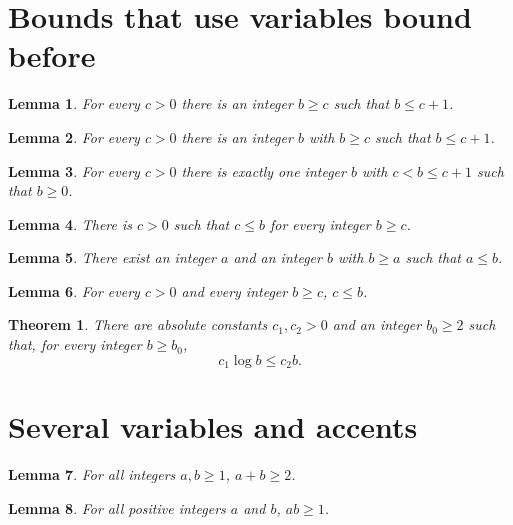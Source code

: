 \documentclass{article}
\newtheorem{theorem}{Theorem}
\newtheorem{lemma}{Lemma}
\begin{document}
\section{Bounds that use variables bound before}

\begin{lemma}\label{exists-bound}
For every $c>0$ there is an integer $b\ge c$ such that $b\le c+1$.
\end{lemma}

\begin{lemma}\label{exists-with}
For every $c>0$ there is an integer $b$ with $b\ge c$ such that $b\le c+1$.
\end{lemma}

\begin{lemma}\label{exactly-one}
For every $c>0$ there is exactly one integer $b$ with $c<b\le c+1$ such that $b\ge0$.
\end{lemma}

\begin{lemma}\label{for-every-after}
There is $c>0$ such that $c\le b$ for every integer $b\ge c$.
\end{lemma}

\begin{lemma}\label{objects}
There exist an integer $a$ and an integer $b$ with $b\ge a$ such that $a\le b$.
\end{lemma}

\begin{lemma}\label{binders}
For every $c>0$ and every integer $b\ge c$, $c\le b$.
\end{lemma}

\begin{theorem}\label{constants-then-binder}
There are absolute constants $c_1,c_2>0$ and an integer $b_0\ge2$ such that, for every
integer $b\ge b_0$,
\[
 c_1\log b\le c_2 b.
\]
\end{theorem}

\section{Several variables and accents}

\begin{lemma}\label{two-integers}
For all integers $a,b\ge1$, $a+b\ge2$.
\end{lemma}

\begin{lemma}\label{and-binder}
For all positive integers $a$ and $b$, $ab\ge1$.
\end{lemma}
\end{document}
